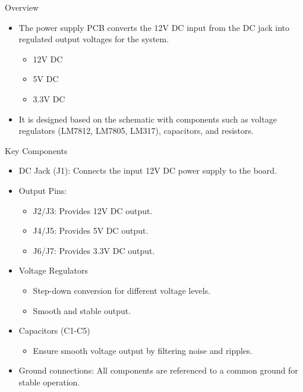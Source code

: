 \documentclass[8pt,compress,aspectratio=169]{beamer}
\begin{document}
\begin{frame}
\begin{minipage}{0.675\textwidth}
    \begin{block}{Overview}
      \begin{itemize}
          \small
        \item The power supply PCB converts the 12V DC input from the DC jack into regulated output voltages for the system.
          \begin{itemize}
              \tiny
            \item  12V DC
            \item 5V DC
            \item 3.3V DC
          \end{itemize}
        \item It is designed based on the schematic with components such as voltage regulators (LM7812, LM7805, LM317), capacitors, and resistors.
      \end{itemize}
    \end{block}
    \begin{block}{Key Components}
      \begin{itemize}
          \footnotesize
        \item DC Jack (J1): Connects the input 12V DC power supply to the board.
        \item Output Pins:
          \begin{itemize}
              \tiny
            \item J2/J3: Provides 12V DC output.
            \item J4/J5: Provides 5V DC output.
            \item J6/J7: Provides 3.3V DC output.
          \end{itemize}
        \item Voltage Regulators
          \begin{itemize}
              \tiny
            \item Step-down conversion for different voltage levels.
            \item Smooth and stable output.
          \end{itemize}
        \item Capacitors (C1-C5)
          \begin{itemize}
              \tiny
            \item Ensure smooth voltage output by filtering noise and ripples.
          \end{itemize}
        \item Ground connections: All components are referenced to a common ground for stable operation.
      \end{itemize}
    \end{block}
  \end{minipage}
\end{frame}
\end{document}
